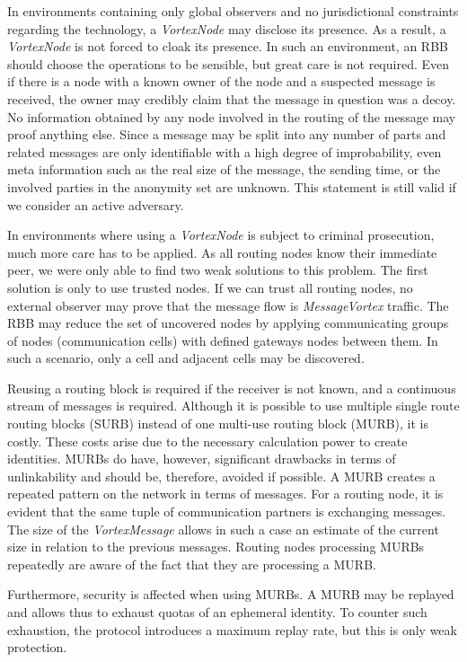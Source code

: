 \documentclass[acmsmall, screen, review]{acmart}
\begin{document}
	In environments containing only global observers and no jurisdictional constraints regarding the technology, a \emph{VortexNode} may disclose its presence. As a result, a \emph{VortexNode} is not forced to cloak its presence. In such an environment, an RBB should choose the operations to be sensible, but great care is not required. Even if there is a node with a known owner of the node and a suspected message is received, the owner may credibly claim that the message in question was a decoy. No information obtained by any node involved in the routing of the message may proof anything else. Since a message may be split into any number of parts and related messages are only identifiable with a high degree of improbability, even meta information such as the real size of the message, the sending time, or the involved parties in the anonymity set are unknown. This statement is still valid if we consider an active adversary.
	
	In environments where using a \emph{VortexNode} is subject to criminal prosecution, much more care has to be applied. As all routing nodes know their immediate peer, we were only able to find two weak solutions to this problem. The first solution is only to use trusted nodes. If we can trust all routing nodes, no external observer may prove that the message flow is \emph{MessageVortex} traffic. The RBB may reduce the set of uncovered nodes by applying communicating groups of nodes (communication cells) with defined gateways nodes between them. In such a scenario, only a cell and adjacent cells may be discovered.
	
	Reusing a routing block is required if the receiver is not known, and a continuous stream of messages is required. Although it is possible to use multiple single route routing blocks (SURB) instead of one multi-use routing block (MURB), it is costly. These costs arise due to the necessary calculation power to create identities. MURBs do have, however, significant drawbacks in terms of unlinkability and should be, therefore, avoided if possible. A MURB creates a repeated pattern on the network in terms of messages. For a routing node, it is evident that the same tuple of communication partners is exchanging messages. The size of the \emph{VortexMessage} allows in such a case an estimate of the current size in relation to the previous messages. Routing nodes processing MURBs repeatedly are aware of the fact that they are processing a MURB.
	
	Furthermore, security is affected when using MURBs. A MURB may be replayed and allows thus to exhaust quotas of an ephemeral identity. To counter such exhaustion, the protocol introduces a maximum replay rate, but this is only weak protection.
	
\end{document}
